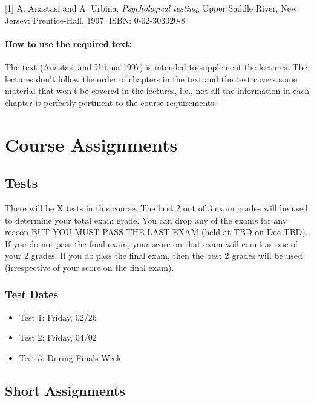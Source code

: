 \documentclass[11pt,]{article}
\begin{document}
{[}1{]} A. Anastasi and A. Urbina. \emph{Psychological testing}. Upper
Saddle River, New Jersey: Prentice-Hall, 1997. ISBN: 0-02-303020-8.

\hypertarget{how-to-use-the-required-text}{%
\paragraph{How to use the required
text:}\label{how-to-use-the-required-text}}

The text (Anastasi and Urbina 1997) is intended to supplement the
lectures. The lectures don't follow the order of chapters in the text
and the text covers some material that won't be covered in the lectures,
i.e., not all the information in each chapter is perfectly pertinent to
the course requirements.

\hypertarget{course-assignments}{%
\section{Course Assignments}\label{course-assignments}}

\hypertarget{tests}{%
\subsection{Tests}\label{tests}}

There will be X tests in this course. The best 2 out of 3 exam grades
will be used to determine your total exam grade. You can drop any of the
exams for any reason BUT YOU MUST PASS THE LAST EXAM (held at TBD on Dec
TBD). If you do not pass the final exam, your score on that exam will
count as one of your 2 grades. If you do pass the final exam, then the
best 2 grades will be used (irrespective of your score on the final
exam).

\hypertarget{test-dates}{%
\subsubsection{Test Dates}\label{test-dates}}

\begin{itemize}
\item
  Test 1: Friday, 02/26
\item
  Test 2: Friday, 04/02
\item
  Test 3: During Finals Week
\end{itemize}

\hypertarget{short-assignments}{%
\subsection{Short Assignments}\label{short-assignments}}
\end{document}
